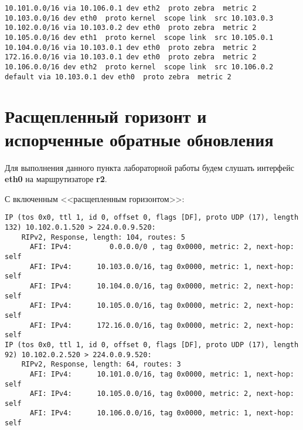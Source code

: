 \documentclass[a4paper,12pt]{article}
\begin{document}
\begin{Verbatim}
10.101.0.0/16 via 10.106.0.1 dev eth2  proto zebra  metric 2 
10.103.0.0/16 dev eth0  proto kernel  scope link  src 10.103.0.3 
10.102.0.0/16 via 10.103.0.2 dev eth0  proto zebra  metric 2 
10.105.0.0/16 dev eth1  proto kernel  scope link  src 10.105.0.1 
10.104.0.0/16 via 10.103.0.1 dev eth0  proto zebra  metric 2 
172.16.0.0/16 via 10.103.0.1 dev eth0  proto zebra  metric 2 
10.106.0.0/16 dev eth2  proto kernel  scope link  src 10.106.0.2 
default via 10.103.0.1 dev eth0  proto zebra  metric 2
\end{Verbatim}

\section{Расщепленный горизонт и испорченные обратные обновления}

Для выполнения данного пункта лабораторной работы будем слушать интерфейс
\textbf{eth0} на маршрутизаторе \textbf{r2}.

С включенным <<расщепленным горизонтом>>:
\begin{Verbatim}
IP (tos 0x0, ttl 1, id 0, offset 0, flags [DF], proto UDP (17), length 132) 10.102.0.1.520 > 224.0.0.9.520: 
	RIPv2, Response, length: 104, routes: 5
	  AFI: IPv4:         0.0.0.0/0 , tag 0x0000, metric: 2, next-hop: self
	  AFI: IPv4:      10.103.0.0/16, tag 0x0000, metric: 1, next-hop: self
	  AFI: IPv4:      10.104.0.0/16, tag 0x0000, metric: 2, next-hop: self
	  AFI: IPv4:      10.105.0.0/16, tag 0x0000, metric: 2, next-hop: self
	  AFI: IPv4:      172.16.0.0/16, tag 0x0000, metric: 2, next-hop: self
IP (tos 0x0, ttl 1, id 0, offset 0, flags [DF], proto UDP (17), length 92) 10.102.0.2.520 > 224.0.0.9.520: 
	RIPv2, Response, length: 64, routes: 3
	  AFI: IPv4:      10.101.0.0/16, tag 0x0000, metric: 1, next-hop: self
	  AFI: IPv4:      10.105.0.0/16, tag 0x0000, metric: 2, next-hop: self
	  AFI: IPv4:      10.106.0.0/16, tag 0x0000, metric: 1, next-hop: self
\end{Verbatim}
\end{document}
